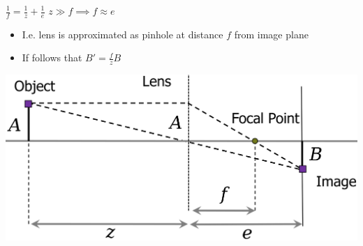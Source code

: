 \begin{itemize}
\begin{minipage}[b]{0.49\linewidth}
    \end{minipage}
     $\frac{1}{f} = \frac{1}{z} + \frac{1}{e}$
     $z \gg f \implies f \approx e$
        \begin{itemize}
            \item I.e. lens is approximated as pinhole at distance $f$ from image plane
            \item If follows that $B' = \frac{f}{z}B$
        \end{itemize}
    \includegraphics[width=\linewidth]{./Figures/04_ThinLensEquation.png}
\end{itemize}

